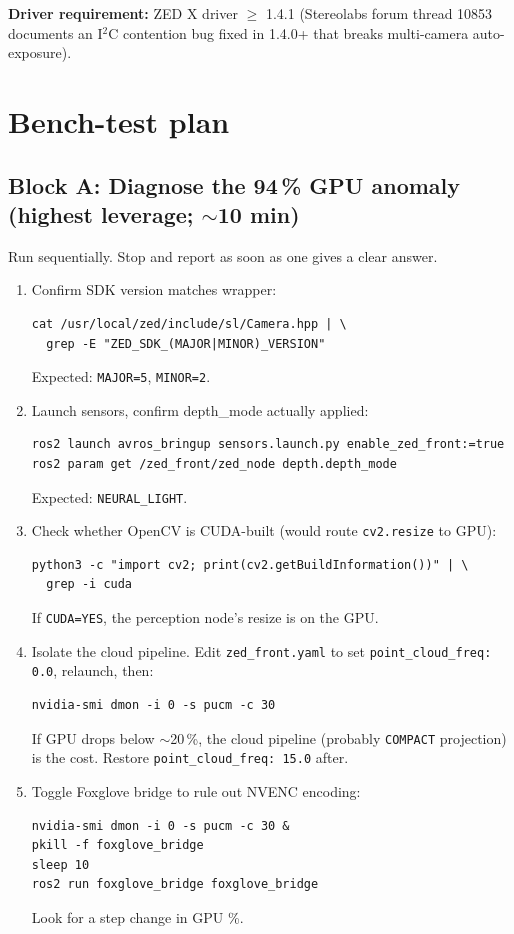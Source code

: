 \documentclass[11pt]{article}
\begin{document}
\textbf{Driver requirement:} ZED X driver $\geq$ 1.4.1 (Stereolabs forum
thread 10853 documents an I$^2$C contention bug fixed in 1.4.0+ that breaks
multi-camera auto-exposure).

\section{Bench-test plan}

\subsection{Block A: Diagnose the 94\,\% GPU anomaly (highest leverage; $\sim$10 min)}

Run sequentially. Stop and report as soon as one gives a clear answer.

\begin{enumerate}[leftmargin=2em,nosep]
\item Confirm SDK version matches wrapper:
\begin{lstlisting}
cat /usr/local/zed/include/sl/Camera.hpp | \
  grep -E "ZED_SDK_(MAJOR|MINOR)_VERSION"
\end{lstlisting}
Expected: \texttt{MAJOR=5}, \texttt{MINOR=2}.

\item Launch sensors, confirm depth\_mode actually applied:
\begin{lstlisting}
ros2 launch avros_bringup sensors.launch.py enable_zed_front:=true
ros2 param get /zed_front/zed_node depth.depth_mode
\end{lstlisting}
Expected: \texttt{NEURAL\_LIGHT}.

\item Check whether OpenCV is CUDA-built (would route \texttt{cv2.resize} to GPU):
\begin{lstlisting}
python3 -c "import cv2; print(cv2.getBuildInformation())" | \
  grep -i cuda
\end{lstlisting}
If \texttt{CUDA=YES}, the perception node's resize is on the GPU.

\item Isolate the cloud pipeline. Edit \texttt{zed\_front.yaml} to set
  \texttt{point\_cloud\_freq: 0.0}, relaunch, then:
\begin{lstlisting}
nvidia-smi dmon -i 0 -s pucm -c 30
\end{lstlisting}
If GPU drops below $\sim$20\,\%, the cloud pipeline (probably \texttt{COMPACT}
projection) is the cost. Restore \texttt{point\_cloud\_freq: 15.0} after.

\item Toggle Foxglove bridge to rule out NVENC encoding:
\begin{lstlisting}
nvidia-smi dmon -i 0 -s pucm -c 30 &
pkill -f foxglove_bridge
sleep 10
ros2 run foxglove_bridge foxglove_bridge
\end{lstlisting}
Look for a step change in GPU \%.

\end{enumerate}
\end{document}
